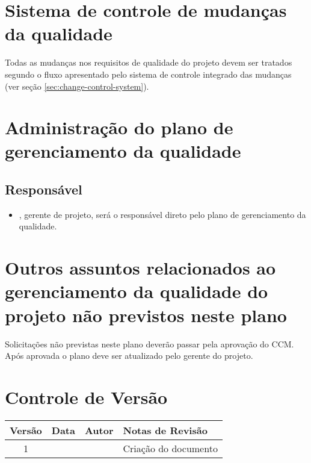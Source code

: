 \section{Sistema de controle de mudanças da qualidade}

Todas as mudanças nos requisitos de qualidade do projeto devem ser tratados segundo o fluxo apresentado pelo sistema de controle integrado das mudanças (ver seção \ref{sec:change-control-system}).



\section{Administração do plano de gerenciamento da qualidade}

\subsection{Responsável}

\begin{itemize}
	\item \projectManagerName, gerente de projeto, será o responsável direto pelo plano de gerenciamento da qualidade.
\end{itemize}

\section{Outros assuntos relacionados ao gerenciamento da qualidade do projeto não previstos neste plano}

Solicitações não previstas neste plano deverão passar pela aprovação do CCM. Após aprovada o plano deve ser atualizado pelo gerente do projeto.

\section{Controle de Versão}

\begin{table}[H]
	\begin{tabularx}{\textwidth}{| c | c | X | X |}
		\hline
		\textbf{Versão} & \textbf{Data} & \textbf{Autor}      & \textbf{Notas de Revisão} \\
		\hline
		1                &               & \projectManagerName & Criação do documento     \\
		\hline
	\end{tabularx}
	\centering
\end{table}

